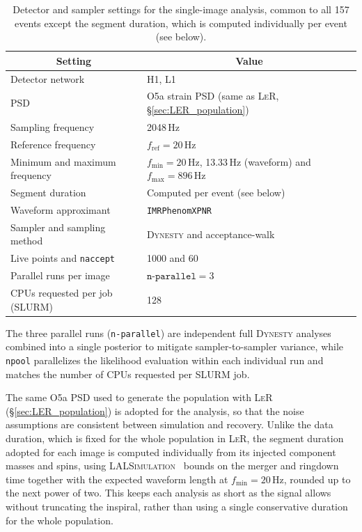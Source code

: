 \begin{table}[h!]
\centering
\renewcommand{\arraystretch}{1.2}
\begin{tabular}{ll}
\hline\hline
\multicolumn{1}{c}{Setting} & \multicolumn{1}{c}{Value} \\
\hline
Detector network & H1, L1 \\
PSD & O5a strain PSD (same as \textsc{LeR}, \S\ref{sec:LER_population}) \\
Sampling frequency & 2048\,Hz \\
Reference frequency & $f_{\text{ref}}=20$\,Hz \\
Minimum and maximum frequency & $f_{\min}=20$\,Hz, 13.33\,Hz (waveform) and $f_{\max}=896$\,Hz\\
Segment duration & Computed per event (see below) \\
Waveform approximant & \texttt{IMRPhenomXPNR} \cite{IMRPhenomXPNR} \\
Sampler and sampling method & \textsc{Dynesty} \cite{MCMC_vs_NS} and acceptance-walk\\
Live points and \texttt{naccept} & 1000 and 60\\
Parallel runs per image & $\texttt{n-parallel}=3$\\
CPUs requested per job (SLURM) & 128 \\
\hline
\end{tabular}
\caption{Detector and sampler settings for the single-image analysis, common to all 157 events except the segment duration, which is computed individually per event (see below).}
\label{tab:bilby_settings}
\end{table}
The three parallel runs (\texttt{n-parallel}) are independent full \textsc{Dynesty} analyses combined into a single posterior to mitigate sampler-to-sampler variance, while \texttt{npool} parallelizes the likelihood evaluation within each individual run and matches the number of CPUs requested per SLURM job.

The same O5a PSD used to generate the population with \textsc{LeR} (\S\ref{sec:LER_population}) is adopted for the analysis, so that the noise assumptions are consistent between simulation and recovery. Unlike the data duration, which is fixed for the whole population in \textsc{LeR}, the segment duration adopted for each image is computed individually from its injected component masses and spins, using \textsc{LALSimulation}~\cite{lalsuite} bounds on the merger and ringdown time together with the expected waveform length at $f_{\min}=20$\,Hz, rounded up to the next power of two. This keeps each analysis as short as the signal allows without truncating the inspiral, rather than using a single conservative duration for the whole population.

